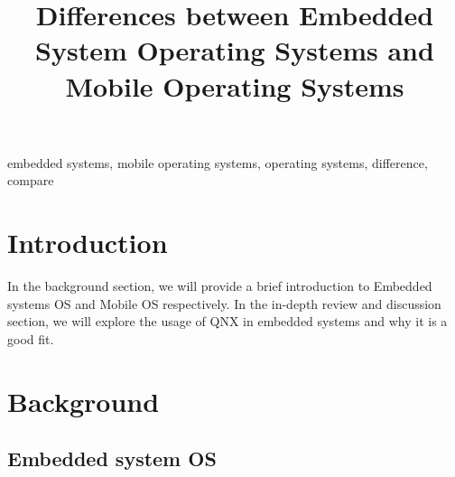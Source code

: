 \documentclass[conference]{IEEEtran}
\begin{document}
\title{Differences between Embedded System Operating Systems and Mobile Operating Systems\\
}



\maketitle

\begin{abstract}
\end{abstract}

\begin{IEEEkeywords}
embedded systems, mobile operating systems, operating systems, difference, compare
\end{IEEEkeywords}

\section{Introduction}
In the background section, we will provide a brief introduction to Embedded systems OS and Mobile OS respectively. In the in-depth review and discussion section, we will explore the usage of QNX in embedded systems and why it is a good fit.

\section{Background}
\subsection{Embedded system OS}
\end{document}
